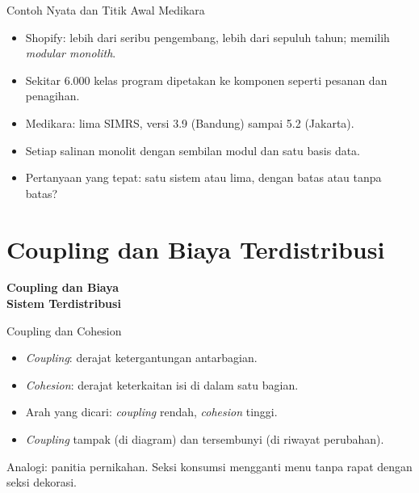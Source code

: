 \documentclass[aspectratio=169, table, 12pt]{beamer}
\begin{document}
\begin{frame}{{\Large Contoh Nyata dan Titik Awal Medikara}}
  \vspace{10pt}
  \begin{itemize}
    \item Shopify: lebih dari seribu pengembang, lebih dari sepuluh tahun; memilih
          \textit{modular monolith}.
    \item Sekitar 6.000 kelas program dipetakan ke komponen seperti pesanan dan penagihan.
    \item Medikara: lima SIMRS, versi 3.9 (Bandung) sampai 5.2 (Jakarta).
    \item Setiap salinan monolit dengan sembilan modul dan satu basis data.
    \item Pertanyaan yang tepat: satu sistem atau lima, dengan batas atau tanpa batas?
  \end{itemize}
\end{frame}

\section{Coupling dan Biaya Terdistribusi}

\begin{frame}{\hfill}
  \centering
  \Huge{\textbf{Coupling dan Biaya\\Sistem Terdistribusi}}
\end{frame}

\begin{frame}{{\Large Coupling dan Cohesion}}
  \vspace{10pt}
  \begin{itemize}
    \item \textit{Coupling}: derajat ketergantungan antarbagian.
    \item \textit{Cohesion}: derajat keterkaitan isi di dalam satu bagian.
    \item Arah yang dicari: \textit{coupling} rendah, \textit{cohesion} tinggi.
    \item \textit{Coupling} tampak (di diagram) dan tersembunyi (di riwayat perubahan).
  \end{itemize}
  \vspace{6pt}
  {\small Analogi: panitia pernikahan. Seksi konsumsi mengganti menu tanpa rapat dengan seksi
  dekorasi.}
\end{frame}
\end{document}
